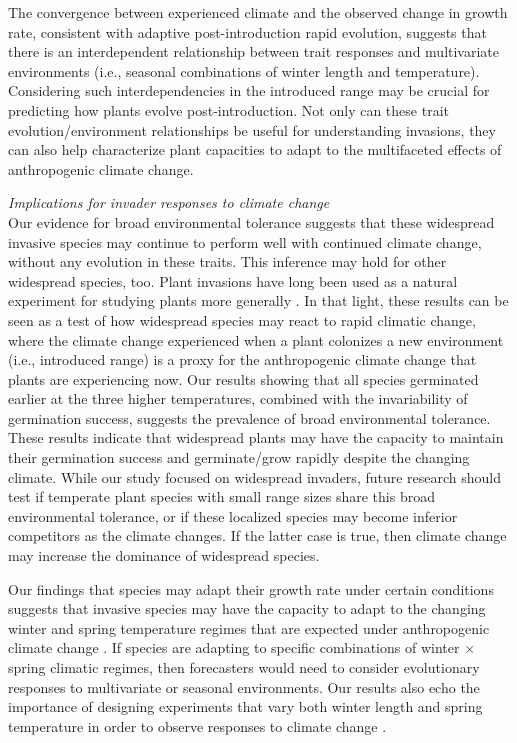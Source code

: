 \documentclass[11pt]{article}\usepackage[]{graphicx}\usepackage[]{color}
\begin{document}
	 The convergence between experienced climate and the observed change in growth rate, consistent with adaptive post-introduction rapid evolution, suggests that there is an interdependent relationship between trait responses and multivariate environments (i.e., seasonal combinations of winter length and temperature). Considering such interdependencies in the introduced range may be crucial for predicting how plants evolve post-introduction. Not only can these trait evolution/environment relationships be useful for understanding invasions, they can also help characterize plant capacities to adapt to the multifaceted effects of anthropogenic climate change. 

\emph{Implications for invader responses to climate change}\\ %
	Our evidence for broad environmental tolerance suggests that these widespread invasive species may continue to perform well with continued climate change, without any evolution in these traits. This inference may hold for other widespread species, too. Plant invasions have long been used as a natural experiment for studying plants more generally \parencite[e.g., ][]{Yoshida2007}. In that light, these results can be seen as a test of how widespread species may react to rapid climatic change, where the climate change experienced when a plant colonizes a new environment (i.e., introduced range) is a proxy for the anthropogenic climate change that plants are experiencing now. Our results showing that all species germinated earlier at the three higher temperatures, combined with the invariability of germination success, suggests the prevalence of broad environmental tolerance. These results indicate that widespread plants may have the capacity to maintain their germination success and germinate/grow rapidly despite the changing climate. While our study focused on widespread invaders, future research should test if temperate plant species with small range sizes share this broad environmental tolerance, or if these localized species may become inferior competitors as the climate changes. If the latter case is true, then climate change may increase the dominance of widespread species. 
	
	 Our findings that species may adapt their growth rate under certain conditions suggests that invasive species may have the capacity to adapt to the changing winter and spring temperature regimes that are expected under anthropogenic climate change \parencite{IPCC2015}. If species are adapting to specific combinations of winter $\times$ spring climatic regimes, then forecasters would need to consider evolutionary responses to multivariate or seasonal environments. Our results also echo the importance of designing experiments that vary both winter length and spring temperature in order to observe responses to climate change \parencite[e.g.,][]{Bernareggi2016}. 
\end{document}
